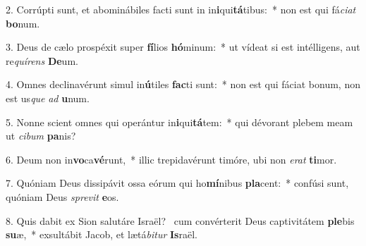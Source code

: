 2. Corrúpti sunt, et abominábiles facti sunt in in\textbf{i}qui\textbf{tá}tibus:~*  non est qui fá\textit{ci}\textit{at} \textbf{bo}num.\

3. Deus de cælo prospéxit super \textbf{fí}lios \textbf{hó}minum:~*  ut vídeat si est intélligens, aut re\textit{quí}\textit{rens} \textbf{De}um.\

4. Omnes declinavérunt simul in\textbf{ú}tiles \textbf{fac}ti sunt:~*  non est qui fáciat bonum, non est us\textit{que} \textit{ad} \textbf{u}num.\

5. Nonne scient omnes qui operántur in\textbf{i}qui\textbf{tá}tem:~*  qui dévorant plebem meam ut \textit{ci}\textit{bum} \textbf{pa}nis?\

6. Deum non in\textbf{vo}ca\textbf{vé}runt,~*  illic trepidavérunt timóre, ubi non \textit{e}\textit{rat} \textbf{ti}mor.\

7. Quóniam Deus dissipávit ossa eórum qui ho\textbf{mí}nibus \textbf{pla}cent:~*  confúsi sunt, quóniam Deus \textit{spre}\textit{vit} \textbf{e}os.\

8. Quis dabit ex Sion salutáre Israël? \dag\  cum convérterit Deus captivitátem \textbf{ple}bis \textbf{su}æ,~*  exsultábit Jacob, et lætá\textit{bi}\textit{tur} \textbf{Is}raël.\

